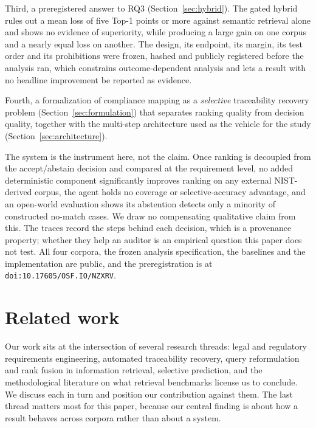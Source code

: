 \documentclass[a4paper,fleqn]{cas-sc}
\begin{document}
Third, a preregistered answer to RQ3 (Section~\ref{sec:hybrid}). The gated hybrid rules out a mean loss of five Top-1 points or more against semantic retrieval alone and shows no evidence of superiority, while producing a large gain on one corpus and a nearly equal loss on another. The design, its endpoint, its margin, its test order and its prohibitions were frozen, hashed and publicly registered before the analysis ran, which constrains outcome-dependent analysis and lets a result with no headline improvement be reported as evidence.

Fourth, a formalization of compliance mapping as a \emph{selective} traceability recovery problem (Section~\ref{sec:formulation}) that separates ranking quality from decision quality, together with the multi-step architecture used as the vehicle for the study (Section~\ref{sec:architecture}).

The system is the instrument here, not the claim. Once ranking is decoupled from the accept/abstain decision and compared at the requirement level, no added deterministic component significantly improves ranking on any external NIST-derived corpus, the agent holds no coverage or selective-accuracy advantage, and an open-world evaluation shows its abstention detects only a minority of constructed no-match cases.
We draw no compensating qualitative claim from this.
The traces record the steps behind each decision, which is a provenance property; whether they help an auditor is an empirical question this paper does not test.
All four corpora, the frozen analysis specification, the baselines and the implementation are public, and the preregistration is at \texttt{doi:10.17605/OSF.IO/NZXRV}.


\section{Related work}
\label{sec:related}

Our work sits at the intersection of several research threads: legal and regulatory requirements engineering, automated traceability recovery, query reformulation and rank fusion in information retrieval, selective prediction, and the methodological literature on what retrieval benchmarks license us to conclude.
We discuss each in turn and position our contribution against them.
The last thread matters most for this paper, because our central finding is about how a result behaves across corpora rather than about a system.
\end{document}
